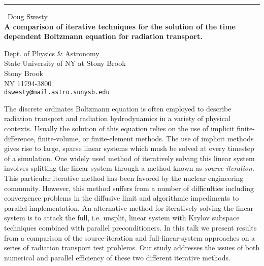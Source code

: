 \documentclass{report}
\begin{document}
\begin{center}
\rule{6in}{1pt} \
{\large Doug Swesty \\
{\bf A comparison of iterative techniques for the solution of the time dependent Boltzmann equation for radiation transport.}}

Dept. of Physics & Astronomy \\ State University of NY at Stony Brook \\ Stony Brook \\ NY 11794-3800
\\
{\tt dswesty@mail.astro.sunysb.edu}\end{center}

The discrete ordinates Boltzmann equation is often employed to
describe radiation transport and radiation hydrodynamics in a variety of
physical contexts. Usually the solution of this equation relies on the
use of implicit finite-difference, finite-volume, or finite-element
methods. The use of implicit methods gives rise to large, sparse linear
systems which mush be solved at every timestep of a simulation. One
widely used method of iteratively solving this linear system involves
splitting the linear system through a method known as {\it
source-iteration}. This particular iterative method has been favored by
the nuclear
engineering community. However, this method suffers from a number of
difficulties including convergence problems in the diffusive limit and
algorithmic impediments to parallel implementation. An alternative method
for iteratively solving the linear system is to attack the full, i.e.
unsplit, linear system with Krylov subspace techniques combined with
parallel preconditioners. In this talk we present results from a
comparison of the source-iteration and
full-linear-system approaches on a series of radiation transport test
problems. Our study addresses the issues of both numerical and parallel
efficiency of these two different iterative methods.
\end{document}
